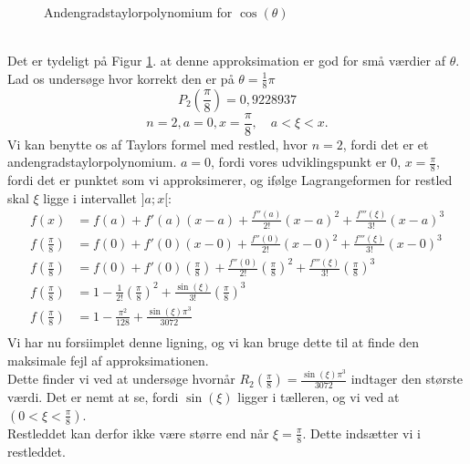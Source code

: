\documentclass[12pt, a4paper]{article}
\begin{document}
\begin{refsection}
\begin{figure}[h!]
     \caption{Andengradstaylorpolynomium for $\cos(\theta)$}
     \label{fig:cosinusanden}
\end{figure}\\
Det er tydeligt på Figur \ref{fig:cosinusanden}. at denne approksimation er god for små værdier af $\theta$. Lad os undersøge hvor korrekt den er på $\theta=\frac{1}{8}\pi$
\begin{equation*}
    P_2\left(\frac{\pi}{8}\right)=0{,}9228937
\end{equation*}
\[
n=2, a=0, x=\frac{\pi}{8}, \quad a<\xi<x
.\] 
Vi kan benytte os af Taylors formel med restled, hvor $n=2$, fordi det er et andengradstaylorpolynomium.  $a=0$, fordi vores udviklingspunkt er 0,  $x=\frac{\pi}{8}$, fordi det er punktet som vi approksimerer, og ifølge Lagrangeformen for restled skal $\xi$ ligge i intervallet $]a;x[$:
\begin{equation*}
    \begin{aligned}
    f(x)&=f(a)+f'(a)(x-a)+\frac{f''(a)}{2!}(x-a)^2+\frac{f'''(\xi)}{3!}(x-a)^3\\
    f\left(\frac{\pi}{8}\right)&=f(0)+f'(0)(x-0)+\frac{f''(0)}{2!}(x-0)^2+\frac{f'''(\xi)}{3!}(x-0)^3\\
    f\left(\frac{\pi}{8}\right)&=f(0)+f'(0)\left(\frac{\pi}{8}\right)+\frac{f''(0)}{2!}\left(\frac{\pi}{8}\right)^2+\frac{f'''(\xi)}{3!}\left(\frac{\pi}{8}\right)^3\\
    f\left(\frac{\pi}{8}\right)&=1-\frac{1}{2!}\left(\frac{\pi}{8}\right)^2+\frac{\sin(\xi)}{3!}\left(\frac{\pi}{8}\right)^3\\
    f\left(\frac{\pi}{8}\right)&=1-\frac{\pi^2}{128}+\frac{\sin(\xi)\pi^3}{3072}\\
    \end{aligned}
\end{equation*}
Vi har nu forsiimplet denne ligning, og vi kan bruge dette til at finde den maksimale fejl af approksimationen.\\
Dette finder vi ved at undersøge hvornår $R_2\left(\frac{\pi}{8}\right)=\frac{\sin(\xi)\pi^3}{3072}$ indtager den største værdi. Det er nemt at se, fordi $\sin(\xi)$ ligger i tælleren, og vi ved at  $(0<\xi<\frac{\pi}{8})$.\\
Restleddet kan derfor ikke være større end når $\xi=\frac{\pi}{8}$. Dette indsætter vi i restleddet.

\end{refsection}
\end{document}
